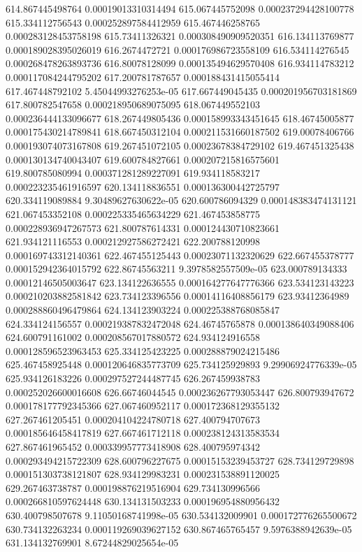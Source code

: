 {614.867445498764 0.00019013310314494
615.067445752098 0.000237294428100778
615.334112756543 0.000252897584412959
615.467446258765 0.000283128453758198
615.73411326321 0.000308490909520351
616.134113769877 0.000189028395026019
616.2674472721 0.000176986723558109
616.534114276545 0.000268478263893736
616.80078128099 0.000135494629570408
616.934114783212 0.000117084244795202
617.200781787657 0.000188431415055414
617.467448792102 5.45044993276253e-05
617.667449045435 0.000201956703181869
617.800782547658 0.000218950689075095
618.067449552103 0.000236444133096677
618.267449805436 0.000158993343451645
618.46745005877 0.000175430214789841
618.667450312104 0.000211531660187502
619.00078406766 0.000193074073167808
619.267451072105 0.00023678384729102
619.467451325438 0.000130134740043407
619.600784827661 0.000207215816575601
619.800785080994 0.000371281289227091
619.934118583217 0.000223235461916597
620.134118836551 0.000136300442725797
620.334119089884 9.30489627630622e-05
620.600786094329 0.000148383474131121
621.067453352108 0.000225335465634229
621.467453858775 0.000228936947267573
621.800787614331 0.000124430710823661
621.934121116553 0.000212927586272421
622.200788120998 0.000169743312140361
622.467455125443 0.00023071132320629
622.667455378777 0.000152942364015792
622.86745563211 9.3978582557509e-05
623.000789134333 0.00012146505003647
623.134122636555 0.000164277647776366
623.534123143223 0.000210203882581842
623.734123396556 0.00014116408856179
623.93412364989 0.000288860496479864
624.134123903224 0.000225388768085847
624.334124156557 0.000219387832472048
624.46745765878 0.000138640349088406
624.600791161002 0.000208567017880572
624.934124916558 0.000128596523963453
625.334125423225 0.000288879024215486
625.467458925448 0.000120646835773709
625.734125929893 9.29906924776339e-05
625.934126183226 0.000297527244487745
626.267459938783 0.000252026600016608
626.66746044545 0.000236267793053447
626.800793947672 0.000178177792345366
627.067460952117 0.000172368129355132
627.267461205451 0.000204104224780718
627.400794707673 0.000185646458417819
627.667461712118 0.000238124313583534
627.867461965452 0.000339957773418908
628.400795974342 0.000293494215722309
628.600796227675 0.00015153239453727
628.734129729898 0.000151303738121807
628.934129983231 0.000231538891120025
629.267463738787 0.000198876219516904
629.734130996566 0.000266810597624448
630.134131503233 0.000196954880956432
630.400798507678 9.11050168741998e-05
630.534132009901 0.000172776265500672
630.734132263234 0.000119269039627152
630.867465765457 9.5976388942639e-05
631.134132769901 8.67244829025654e-05
}
